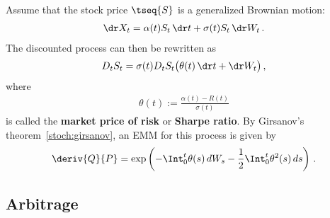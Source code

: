     \begin{example}
        Assume that the stock price $\tseq{S}$ is a generalized Brownian motion:
        \begin{gather}
            \dr X_t = \alpha(t)S_t\,\dr t + \sigma(t)S_t\,\dr W_t\,.
        \end{gather}
        The discounted process can then be rewritten as
        \begin{gather}
            D_tS_t = \sigma(t)D_tS_t\bigl(\theta(t)\,\dr t + \dr W_t\bigr)\,,
        \end{gather}
        where
        \begin{gather}
            \theta(t) := \frac{\alpha(t) - R(t)}{\sigma(t)}
        \end{gather}
        is called the \textbf{market price of risk} or \textbf{Sharpe ratio}. By Girsanov's theorem~\ref{stoch:girsanov}, an EMM for this process is given by
        \begin{gather}
            \deriv{Q}{P} = \exp\left(-\Int_0^t\theta(s)\,dW_s - \frac{1}{2}\Int_0^t\theta^2(s)\,ds\right)\,.
        \end{gather}
    \end{example}


\subsection{Arbitrage}

